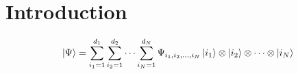 \documentclass{article}
\begin{document}
	\section{Introduction}	

	\begin{equation}
		\ket{\Psi} = \sum_{i_1=1}^{d_1} \sum_{i_2=1}^{d_2} \cdots \sum_{i_N=1}^{d_N} \Psi_{i_1,i_2,\dots,i_N} \ket{i_1} \otimes \ket{i_2} \otimes \cdots \otimes \ket{i_N} 
	\end{equation}
\end{document}
